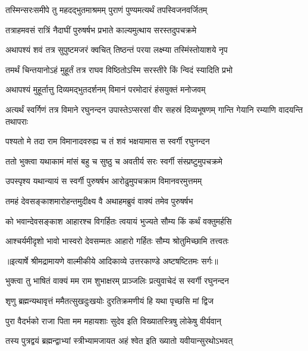 \twolineshloka
{तस्मिन्सरःसमीपे तु महदद्भुतमाश्रमम्}
{पुराणं पुण्यमत्यर्थं तपस्विजनवर्जितम्} %

\twolineshloka
{तत्राहमवसं रात्रिं नैदाघीं पुरुषर्षभ}
{प्रभाते काल्यमुत्थाय सरस्तदुपचक्रमे} %

\twolineshloka
{अथापश्यं शवं तत्र सुपुष्टमजरं क्वचित्}
{तिष्ठन्तं परया लक्ष्म्या तस्मिंस्तोयाशये नृप} %

\twolineshloka
{तमर्थं चिन्तयानोऽहं मुहूर्तं तत्र राघव}
{विष्ठितोऽस्मि सरस्तीरे किं न्विदं स्यादिति प्रभो} %

\twolineshloka
{अथापश्यं मुहूर्तात्तु दिव्यमद्भुतदर्शनम्}
{विमानं परमोदारं हंसयुक्तं मनोजवम्} %

\threelineshloka
{अत्यर्थं स्वर्गिणं तत्र विमाने रघुनन्दन}
{उपास्तेऽप्सरसां वीर सहस्रं दिव्यभूषणम्}
{गान्ति गेयानि रम्याणि वादयन्ति तथापराः} %

\twolineshloka
{पश्यतो मे तदा राम विमानादवरुह्य च}
{तं शवं भक्षयामास स स्वर्गी रघुनन्दन} %

\twolineshloka
{ततो भुक्त्वा यथाकामं मांसं बहु च सुष्ठु च}
{अवतीर्य सरः स्वर्गी संस्प्रष्टुमुपचक्रमे} %

\twolineshloka
{उपस्पृश्य यथान्यायं स स्वर्गी पुरुषर्षभ}
{आरोढुमुपचक्राम विमानवरमुत्तमम्} %

\twolineshloka
{तमहं देवसङ्काशमारोहन्तमुदीक्ष्य वै}
{अथाहमब्रुवं वाक्यं तमेव पुरुषर्षभ} %

\twolineshloka
{को भवान्देवसङ्काश आहारश्च विगर्हितः}
{त्वयायं भुज्यते सौम्य किं कर्थं वक्तुमर्हसि} %

\twolineshloka
{आश्चर्यमीदृशो भावो भास्वरो देवसम्मतः}
{आहारो गर्हितः सौम्य श्रोतुमिच्छामि तत्त्वतः} %


{॥इत्यार्षे श्रीमद्रामायणे वाल्मीकीये आदिकाव्ये उत्तरकाण्डे अष्टषष्टितमः सर्गः॥}


\twolineshloka
{भुक्त्वा तु भाषितं वाक्यं मम राम शुभाक्षरम्}
{प्राञ्जलिः प्रत्युवाचेदं स स्वर्गी रघुनन्दन} %

\twolineshloka
{शृणु ब्रह्मन्यथावृत्तं ममैतत्सुखदुःखयोः}
{दुरतिक्रमणीयं हि यथा पृच्छसि मां द्विज} %

\twolineshloka
{पुरा वैदर्भको राजा पिता मम महायशाः}
{सुदेव इति विख्यातस्त्रिषु लोकेषु वीर्यवान्} %

\twolineshloka
{तस्य पुत्रद्वयं ब्रह्मन्द्वाभ्यां स्त्रीभ्यामजायत}
{अहं श्वेत इति ख्यातो यवीयान्सुरथोऽभवत्} %

